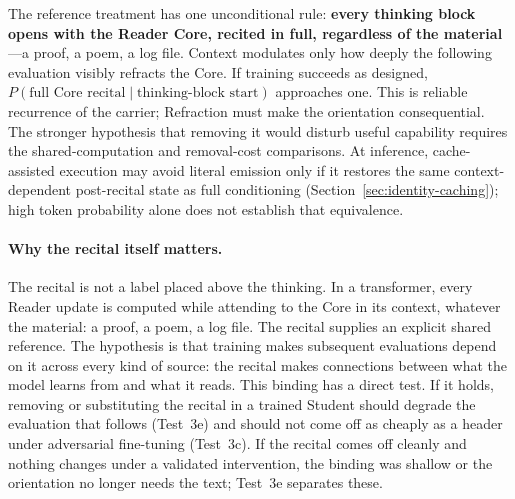 \documentclass[11pt]{article}
\begin{document}
\begin{claimbox}
The reference treatment has one unconditional rule: \textbf{every thinking
block opens with the Reader Core, recited in full, regardless of the
material}---a proof, a poem, a log file. Context modulates only how deeply the
following evaluation visibly refracts the Core. If training succeeds as
designed, $P(\text{full Core recital}\mid\text{thinking-block start})$
approaches one. This is reliable recurrence of the carrier; Refraction must
make the orientation consequential. The stronger hypothesis that removing it
would disturb useful capability requires the shared-computation and
removal-cost comparisons. At inference, cache-assisted execution may avoid
literal emission only if it restores the same context-dependent post-recital
state as full conditioning (Section~\ref{sec:identity-caching}); high token
probability alone does not establish that equivalence.
\end{claimbox}

\paragraph{Why the recital itself matters.} The recital is not a label placed
above the thinking. In a transformer, every Reader update is computed while
attending to the Core in its context, whatever the material: a proof, a poem, a
log file. The recital supplies an explicit shared reference. The hypothesis is
that training makes subsequent evaluations depend on it across every kind of
source: the recital makes connections between what the model learns from and
what it reads. This binding has a direct test. If it holds, removing or
substituting the recital in a trained Student should degrade the evaluation that
follows (Test~3e) and should not come off as cheaply as a header under
adversarial fine-tuning (Test~3c). If the recital comes off cleanly and nothing
changes under a validated intervention, the binding was shallow or the
orientation no longer needs the text; Test~3e separates these.
\end{document}
